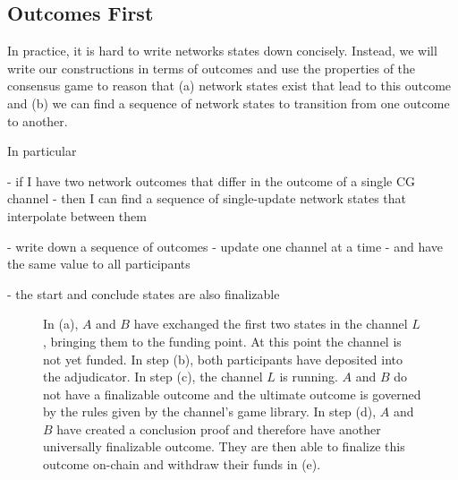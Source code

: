 \subsection{Outcomes First}

In practice, it is hard to write networks states down concisely.
Instead, we will write our constructions in terms of outcomes and use the properties of the consensus game to reason that (a) network states exist that lead to this outcome and (b) we can find a sequence of network states to transition from one outcome to another.

In particular

- if I have two network outcomes that differ in the outcome of a single CG channel
- then I can find a sequence of single-update network states that interpolate between them

- write down a sequence of outcomes
- update one channel at a time
- and have the same value to all participants

- the start and conclude states are also finalizable

\begin{figure}[h]\centering
  \makebox[\textwidth][c]{}
  \caption{
    In (a), $A$ and $B$ have exchanged the first two states in the channel $L$, bringing them to the funding point. At this point the channel is not yet funded.
    In step (b), both participants have deposited into the adjudicator.
    In step (c), the channel $L$ is running.
    $A$ and $B$ do not have a finalizable outcome and the ultimate outcome is governed by the rules given by the channel's game library.
    In step (d), $A$ and $B$ have created a conclusion proof and therefore have another universally finalizable outcome.
    They are then able to finalize this outcome on-chain and withdraw their funds in (e).
  }
\end{figure}
